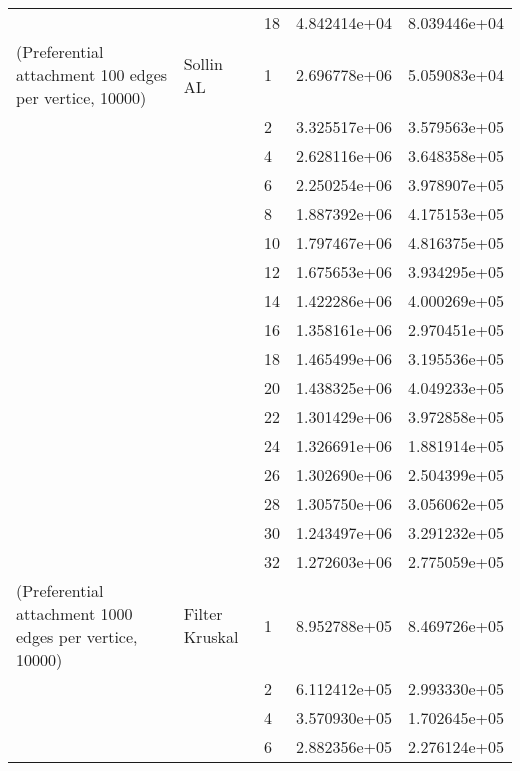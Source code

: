 \begin{tabular}{lllrr}
                      &            & 18 &  4.842414e+04 &  8.039446e+04 \\
(Preferential attachment 100 edges per vertice, 10000) & Sollin AL & 1  &  2.696778e+06 &  5.059083e+04 \\
                      &            & 2  &  3.325517e+06 &  3.579563e+05 \\
                      &            & 4  &  2.628116e+06 &  3.648358e+05 \\
                      &            & 6  &  2.250254e+06 &  3.978907e+05 \\
                      &            & 8  &  1.887392e+06 &  4.175153e+05 \\
                      &            & 10 &  1.797467e+06 &  4.816375e+05 \\
                      &            & 12 &  1.675653e+06 &  3.934295e+05 \\
                      &            & 14 &  1.422286e+06 &  4.000269e+05 \\
                      &            & 16 &  1.358161e+06 &  2.970451e+05 \\
                      &            & 18 &  1.465499e+06 &  3.195536e+05 \\
                      &            & 20 &  1.438325e+06 &  4.049233e+05 \\
                      &            & 22 &  1.301429e+06 &  3.972858e+05 \\
                      &            & 24 &  1.326691e+06 &  1.881914e+05 \\
                      &            & 26 &  1.302690e+06 &  2.504399e+05 \\
                      &            & 28 &  1.305750e+06 &  3.056062e+05 \\
                      &            & 30 &  1.243497e+06 &  3.291232e+05 \\
                      &            & 32 &  1.272603e+06 &  2.775059e+05 \\
(Preferential attachment 1000 edges per vertice, 10000) & Filter Kruskal & 1  &  8.952788e+05 &  8.469726e+05 \\
                      &            & 2  &  6.112412e+05 &  2.993330e+05 \\
                      &            & 4  &  3.570930e+05 &  1.702645e+05 \\
                      &            & 6  &  2.882356e+05 &  2.276124e+05 \\

\end{tabular}
